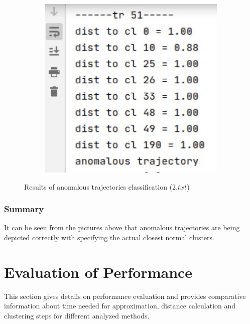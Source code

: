 \begin{figure}[htb!]
\begin{subfigure}[!htb]{0.70\textwidth}
		\caption{}
	\end{subfigure}
	\hfill
	\begin{subfigure}[!htb]{0.28\textwidth}
		\centering{}
		\includegraphics[width=\textwidth]{images/classif-res/classif-anom-res-2-2-stat.jpeg}
		\caption{}
	\end{subfigure}
	
	\caption{Results of anomalous trajectories classification ($2.txt$)}
	\label{fig:classif-anom-res-2}
\end{figure}

\subsubsection{Summary}

It can be seen from the pictures above that anomalous trajectories are being depicted correctly with specifying the actual closest normal clusters.

\section{Evaluation of Performance}

This section gives details on performance evaluation and provides comparative information about time needed for approximation, distance calculation and clustering steps for different analyzed methods.

